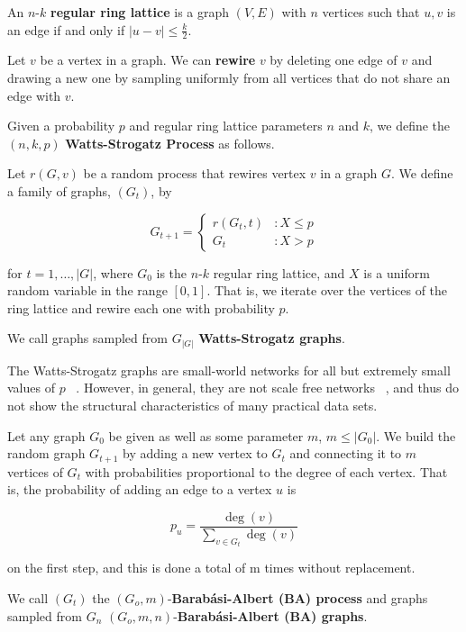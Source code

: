 \begin{definition}
  An $n$-$k$ \textbf{regular ring lattice} is a graph $(V, E)$ with $n$ vertices
  such that $u,v$ is an edge if and only if $|u-v| \leq \frac{k}{2}$.
\end{definition}

\begin{definition}
  Let $v$ be a vertex in a graph. We can \textbf{rewire} $v$ by deleting one
  edge of $v$ and drawing a new one by sampling uniformly from all vertices that
  do not share an edge with $v$.
\end{definition}

\begin{definition}
  Given a probability $p$ and regular ring lattice parameters $n$ and $k$, we
  define the $(n,k,p)$ \textbf{Watts-Strogatz Process} as follows.

  Let $r(G,v)$ be a random process that rewires vertex $v$ in a graph $G$. We
  define a family of graphs, $(G_t)$, by

  \[
    G_{t+1} = \left\{
      \begin{array}{lc}
        r(G_t,t) &: X \leq p \\
        G_t &: X > p
      \end{array}
    \right.
  \]

  for $t = 1,\dots, |G|$, where $G_0$ is the $n$-$k$ regular ring lattice, and
  $X$ is a uniform random variable in the range $[0,1]$. That is, we iterate
  over the vertices of the ring lattice and rewire each one with probability
  $p$.

  We call graphs sampled from $G_{|G|}$ \textbf{Watts-Strogatz graphs}.
\end{definition}

The Watts-Strogatz graphs are small-world networks for all but extremely small
values of $p$ ~\cite{Watts1998Collective}. However, in general, they are not
scale free networks ~\cite{Barabasi509}, and thus do not show the structural
characteristics of many practical data sets.

\begin{definition}
  Let any graph $G_0$ be given as well as some parameter $m$, $m \leq |G_0|$. We
  build the random graph $G_{t+1}$ by adding a new vertex to $G_t$ and
  connecting it to $m$ vertices of $G_t$ with probabilities proportional to the
  degree of each vertex. That is, the probability of adding an edge to a vertex
  $u$ is

  \[
    p_u = \frac{\deg(v)}{\sum_{v \in G_t} \deg(v)}
  \]

  on the first step, and this is done a total of m times without replacement.

  We call $(G_t)$ the $(G_o,m)$-\textbf{Barab\'asi-Albert (BA) process} and graphs
  sampled from $G_n$ $(G_o,m,n)$-\textbf{Barab\'asi-Albert (BA) graphs}.
\end{definition}

